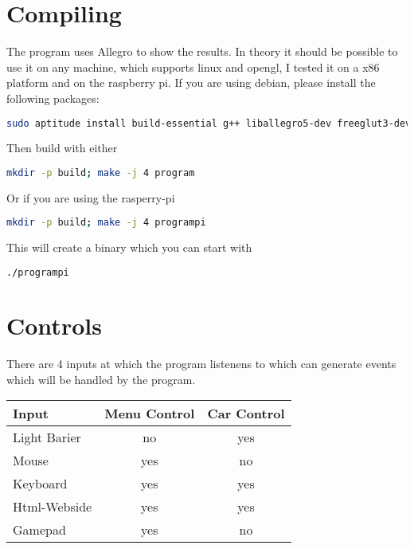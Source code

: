 \documentclass[11pt, a4paper, UKenglish, parskip=half+, oneside]{scrbook}
\begin{document}
\section{Compiling}
The program uses Allegro to show the results. In theory it should be possible to use it on any machine, which supports linux and opengl, I tested it on a x86 platform and on the raspberry pi. If you are using debian, please install the following packages:
\begin{lstlisting}[language=bash,caption={Required packages},breaklines=true]
sudo aptitude install build-essential g++ liballegro5-dev freeglut3-dev libboost-thread-dev libboost-system-dev
\end{lstlisting}
Then build with either
\begin{lstlisting}[language=bash,caption={Compile},breaklines=true]
mkdir -p build; make -j 4 program
\end{lstlisting}
Or if you are using the rasperry-pi
\begin{lstlisting}[language=bash,caption={Compile Pi},breaklines=true]
mkdir -p build; make -j 4 programpi
\end{lstlisting}
This will create a binary which you can start with
\begin{lstlisting}[language=bash,caption={Run Lapcounter},breaklines=true]
./programpi
\end{lstlisting}
\section{Controls}
There are 4 inputs at which the program listenens to which can generate events which will be handled by the program.
\begin{table}[H]
\begin{tabular}{l|c c}
Input & Menu Control & Car Control\\\hline
Light Barier & no & yes\\
Mouse & yes & no\\
Keyboard & yes & yes\\
Html-Webside & yes & yes\\
Gamepad & yes & no
\end{tabular}
\end{table}
\begin{comment}
\begin{table}[H]
\begin{tabular}{l}
Up\\
Down\\
Left\\
Right\\
Enter\\
Back\\
Add Count <n>\\
Remove Count <n>
\end{tabular}
\end{table}
\end{comment}
\end{document}
